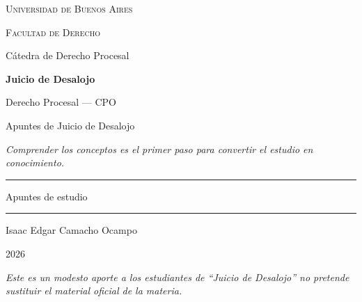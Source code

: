 \documentclass[12pt,oneside]{book}
\newcommand{\universidad}{Universidad de Buenos Aires}
\newcommand{\facultad}{Facultad de Derecho}
\newcommand{\catedra}{Cátedra de Derecho Procesal}
\newcommand{\materia}{Juicio de Desalojo}
\newcommand{\submateria}{Derecho Procesal --- CPO}
\newcommand{\titulo}{Apuntes de Juicio de Desalojo}
\newcommand{\autor}{Isaac Edgar Camacho Ocampo}
\newcommand{\anio}{2026}
\newcommand{\reflexionmotivacional}{Comprender los conceptos es el primer paso para convertir el estudio en conocimiento.}
\begin{document}
\begin{titlepage}

\thispagestyle{empty}

\begin{center}

\vspace*{1cm}

{\large \textsc{\universidad}}

\vspace{0.2cm}

{\large \textsc{\facultad}}

\vspace{0.2cm}

{\large \catedra}

\vspace{3cm}

{\Huge \textbf{\materia}}

\vspace{0.4cm}

{\normalsize \submateria}

\vspace{1cm}

{\LARGE \titulo}

\vspace{0.8cm}

\textit{\reflexionmotivacional}

\vspace{1.2cm}

\rule{0.70\textwidth}{0.5pt}

\vspace{0.5cm}

{\large Apuntes de estudio}

\vspace{0.5cm}

\rule{0.70\textwidth}{0.5pt}

\vfill

{\large \autor}

\vspace{0.3cm}

{\large \anio}

\end{center}

\vfill

\begin{flushleft}
\textit{Este es un modesto aporte a los estudiantes de ``\materia'' no pretende sustituir el material oficial de la materia.}
\end{flushleft}

\end{titlepage}
\end{document}
